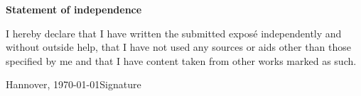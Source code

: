 \documentclass[fontsize=12pt,paper=a4,twoside=semi,parskip=half-,headsepline,headinclude]{scrreprt}
\begin{document}
\vfill

\vfill

\begin{center} \sffamily\bfseries Statement of independence \end{center}

I hereby declare that I have written the submitted exposé
independently and without outside help, that I have not used any sources or aids
other than those specified by me and that I have content taken from other works marked as such.
\vspace*{7ex}

Hannover, \today \hfill Signature
  \tableofcontents  %
\end{document}
